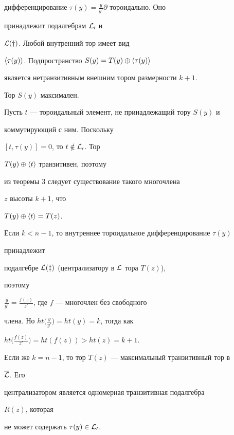 дифференцирование $\tau(y)=\frac{y}{y'}\partial$ тороидально. Оно


принадлежит подалгебрам $\cal L_0$ и


$\cal L(y)$. Любой внутренний тор имеет вид


$\langle\tau(y)\rangle$. Подпространство $S(y)=T(y)\oplus\langle\tau(y)\rangle$


является нетранзитивным внешним тором размерности $k+1$.





\begin{thm}


Тор $S(y)$ максимален.


\end{thm}





\begin{pf}


Пусть $t$ --- тороидальный элемент, не принадлежащий тору $S(y)$ и


коммутирующий с ним. Поскольку


$[t,\tau(y)]=0$, то $t\notin\cal L_0$. Тор


$T(y)\oplus\langle t\rangle$ транзитивен, поэтому


из теоремы 3 следует существование такого многочлена


$z$ высоты $k+1$, что


$T(y)\oplus\langle t\rangle=T(z)$.





Если $k<n-1$, то внутреннее тороидальное дифференцирование $\tau(y)$


принадлежит


подалгебре $\cal L(z)$ (централизатору в $\cal L$ тора $T(z)$),


поэтому


$\frac{y}{y'}=\frac{f(z)}{z'}$, где $f$ --- многочлен без свободного


члена. Но $ht\bigl(\frac{y}{y'}\bigr)=ht(y)=k$, тогда как


$ht\bigl(\frac{f(z)}{z'}\bigr)=ht(f(z))>ht(z)=k+1$.





Если же $k=n-1$, то тор $T(z)$ --- максимальный транзитивный тор в


$\overline{\cal L}$. Его


централизатором является одномерная транзитивная подалгебра


$R(z)$, которая


не может содержать $\tau(y)\in\cal L_0$.


\end{pf}





